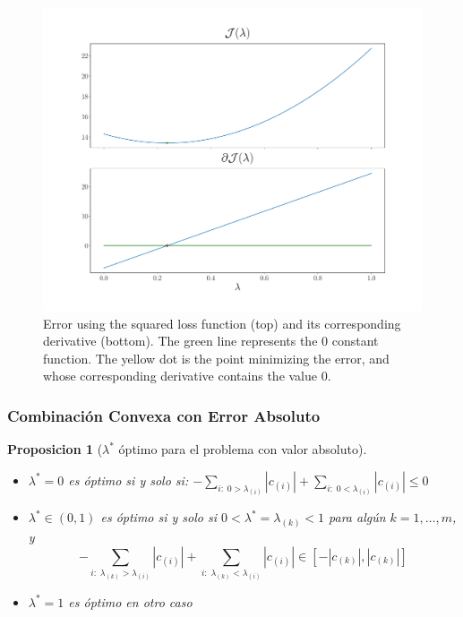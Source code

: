 \documentclass{beamer}
\newtheorem{proposition}[theorem]{Proposicion}
\newcommand{\abs}[1]{\left|#1\right|}
\newcommand{\npertask}{m}
\begin{document}
\begin{frame}

      \begin{figure}[t!]
            \centering
            \includegraphics[width=.6\textwidth]{Chapter4/NeuroCom2021/ejemplo2_mse.pdf}
            \caption{Error using the squared loss function (top) and its corresponding derivative (bottom). The green line represents the $0$ constant function. The yellow dot is the point minimizing the error, and whose corresponding derivative contains the value $0$.}
            \label{fig:sq_error}
        \end{figure}      

\end{frame}



\begin{frame}
      \frametitle{Combinación Convexa con Error Absoluto}

      \begin{proposition}[$\lambda^*$ óptimo para el problema con valor absoluto]\label{prop:abs_neurocom2020}
            \begin{itemize}
                  \item $\lambda^*=0$ es óptimo si y solo si: $- \sum_{i: \; 0 > \lambda_{(i)}} \abs{c_{(i)}} + \sum_{i: \; 0 < \lambda_{(i)}} \abs{c_{(i)}} \leq 0$
                  \item $\lambda^* \in (0,1)$ es óptimo si y solo si $0 < \lambda^* = \lambda_{(k)} < 1$ para algún $k=1, \dotsc, \npertask$, y
                  \begin{equation}
                  \nonumber    
                  - \sum_{i:\; \lambda_{(k)} > \lambda_{(i)}} \abs{c_{(i)}} + \sum_{i:\; \lambda_{(k)} < \lambda_{(i)}} \abs{c_{(i)}} \in \left[ -  \abs{c_{(k)}},  \abs{c_{(k)}}  \right] 
                  \end{equation}
                  \item $\lambda^*=1$ es óptimo en otro caso
            \end{itemize}
        \end{proposition}
\end{frame}
\end{document}
